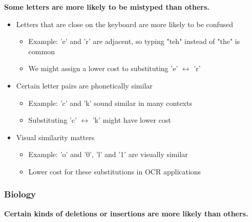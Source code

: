 \documentclass[11pt,a4paper]{article}
\theoremstyle{definition}
\theoremstyle{plain}
\theoremstyle{remark}
\begin{document}
\textbf{Some letters are more likely to be mistyped than others.}

\begin{itemize}
    \item Letters that are close on the keyboard are more likely to be confused
    \begin{itemize}
        \item Example: 'e' and 'r' are adjacent, so typing "teh" instead of "the" is common
        \item We might assign a lower cost to substituting 'e' $\leftrightarrow$ 'r'
    \end{itemize}
    
    \item Certain letter pairs are phonetically similar
    \begin{itemize}
        \item Example: 'c' and 'k' sound similar in many contexts
        \item Substituting 'c' $\leftrightarrow$ 'k' might have lower cost
    \end{itemize}
    
    \item Visual similarity matters
    \begin{itemize}
        \item Example: 'o' and '0', 'l' and '1' are visually similar
        \item Lower cost for these substitutions in OCR applications
    \end{itemize}
\end{itemize}

\subsubsection{Biology}

\textbf{Certain kinds of deletions or insertions are more likely than others.}
\end{document}
